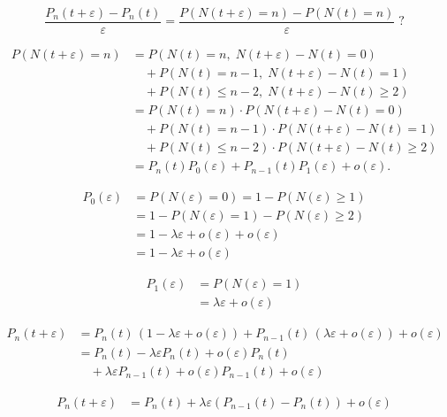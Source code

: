 \documentclass[12pt,a4paper]{article}
\begin{document}
\begin{equation*}
\frac{P_n(t+\varepsilon) - P_n(t)}{\varepsilon}
= \frac{P(N(t+\varepsilon)=n) - P(N(t)=n)}{\varepsilon}\; ?
\end{equation*}

\begin{align*}
P(N(t+\varepsilon) = n) 
&= P(N(t)=n,\; N(t+\varepsilon)-N(t)=0) \\
&\quad + P(N(t)=n-1,\; N(t+\varepsilon)-N(t)=1) \\
&\quad + P(N(t)\leq n-2,\; N(t+\varepsilon)-N(t)\geq 2) \\
&= P(N(t)=n)\cdot P(N(t+\varepsilon)-N(t)=0) \\
&\quad + P(N(t)=n-1)\cdot P(N(t+\varepsilon)-N(t)=1) \\
&\quad + P(N(t)\leq n-2)\cdot P(N(t+\varepsilon)-N(t)\geq 2) \\
&= P_n(t)P_0(\varepsilon) + P_{n-1}(t)P_1(\varepsilon) + o(\varepsilon).
\end{align*}


\begin{align*}
P_0(\varepsilon) &= P(N(\varepsilon)=0) 
= 1 - P(N(\varepsilon)\geq 1) \\
&= 1 - P(N(\varepsilon)=1) - P(N(\varepsilon)\geq 2) \\
&= 1 - \lambda \varepsilon + o(\varepsilon) + o(\varepsilon) \\
&= 1 - \lambda \varepsilon + o(\varepsilon)
\end{align*}

\begin{align*}
P_1(\varepsilon) &= P(N(\varepsilon)=1) \\
&= \lambda \varepsilon + o(\varepsilon)
\end{align*}

\begin{align*}
P_n(t+\varepsilon) 
&= P_n(t)\,(1 - \lambda \varepsilon + o(\varepsilon)) 
   + P_{n-1}(t)\,(\lambda \varepsilon + o(\varepsilon)) 
   + o(\varepsilon) \\
&= P_n(t) - \lambda \varepsilon P_n(t) + o(\varepsilon)P_n(t) \\
&\quad + \lambda \varepsilon P_{n-1}(t) + o(\varepsilon)P_{n-1}(t) 
   + o(\varepsilon)
\end{align*}

\begin{align*}
P_n(t+\varepsilon) &= P_n(t) + \lambda \varepsilon (P_{n-1}(t) - P_n(t)) + o(\varepsilon)
\end{align*}
\end{document}
